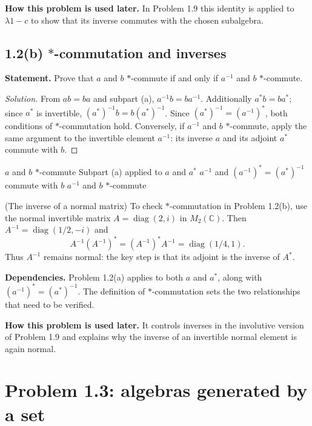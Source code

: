 \noindent\textbf{How this problem is used later.} In Problem 1.9 this identity is applied to $\lambda1-c$ to show that its inverse commutes with the chosen subalgebra.

\subsection*{1.2(b) $*$-commutation and inverses}

\noindent\textbf{Statement.} Prove that $a$ and $b$ $*$-commute if and only if $a^{-1}$ and $b$ $*$-commute.

\begin{proof}[Solution]
From $ab=ba$ and subpart (a), $a^{-1}b=ba^{-1}$. Additionally $a^*b=ba^*$; since $a^*$ is invertible,
$(a^*)^{-1}b=b(a^*)^{-1}$. Since $(a^*)^{-1}=(a^{-1})^*$, both conditions of
$*$-commutation hold. Conversely, if $a^{-1}$ and $b$ $*$-commute, apply the same argument
to the invertible element $a^{-1}$: its inverse $a$ and its adjoint $a^*$ commute with $b$.
\end{proof}

\proofdiagram
{$a$ and $b$ $*$-commute}
{Subpart (a) applied to $a$ and $a^*$}
{$a^{-1}$ and $(a^{-1})^*=(a^*)^{-1}$ commute with $b$}
{$a^{-1}$ and $b$ $*$-commute}

\begin{cthejemplo}{(The inverse of a normal matrix)}
To check $*$-commutation in Problem 1.2(b), use the normal invertible matrix
$A=\operatorname{diag}(2,i)$ in $M_2(\mathbb C)$.
Then $A^{-1}=\operatorname{diag}(1/2,-i)$ and
\[
 A^{-1}(A^{-1})^*=(A^{-1})^*A^{-1}=\operatorname{diag}(1/4,1).
\]
Thus $A^{-1}$ remains normal: the key step is that its adjoint is the inverse of $A^*$.
\end{cthejemplo}

\noindent\textbf{Dependencies.} Problem 1.2(a) applies to both $a$ and $a^*$, along with $(a^{-1})^*=(a^*)^{-1}$. The definition of $*$-commutation sets the two relationships that need to be verified.

\noindent\textbf{How this problem is used later.} It controls inverses in the involutive version of Problem 1.9 and explains why the inverse of an invertible normal element is again normal.

\section{Problem 1.3: algebras generated by a set}

